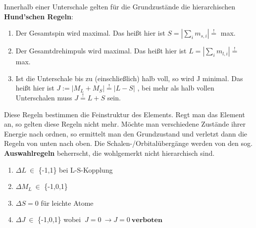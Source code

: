 \documentclass[Ex4_Zusammenfassung.tex]{subfiles}
\begin{document}
Innerhalb einer Unterschale gelten für die Grundzustände die hierarchischen \newline \textbf{Hund'schen Regeln}: 
\begin{enumerate}
\item Der Gesamtspin wird maximal. Das heißt hier ist $S = |\sum_i m_{s,i}| \stackrel{!}{=}$ max. 
\item Der Gesamtdrehimpuls  wird maximal. Das heißt hier ist  $L = |\sum_i m_{l,i}| \stackrel{!}{=}$ max.
\item Ist die Unterschale bis zu (einschließlich) halb voll, so wird J minimal. Das heißt hier ist  $ J := \lvert M_L + M_S \rvert \stackrel{!}{=} \lvert L-S \rvert $ , bei mehr als halb vollen Unterschalen muss $ J \stackrel{!}{=} L+S $ sein. 
\end{enumerate} 

Diese Regeln bestimmen die Feinstruktur des Elements. Regt man das Element an, so gelten diese Regeln nicht mehr. Möchte man verschiedene Zustände ihrer Energie nach ordnen, so ermittelt man den Grundzustand und verletzt dann die Regeln von unten nach oben.
Die  Schalen-/Orbitalübergänge werden von den sog. \textbf{Auswahlregeln} beherrscht, die wohlgemerkt nicht hierarchisch sind. 
\begin{enumerate}
\item $ \Delta L \  \in $ \{-1,1\}  bei L-S-Kopplung
\item $ \Delta M_L \   \in  $ \{-1,0,1\}  
\item $ \Delta S =0 $ für leichte Atome
\item $\Delta J \  \in $  \{-1,0,1\}   wobei $ \ J =0 \  \rightarrow J=0 \  \textbf{verboten} $
\end{enumerate}
\end{document}
